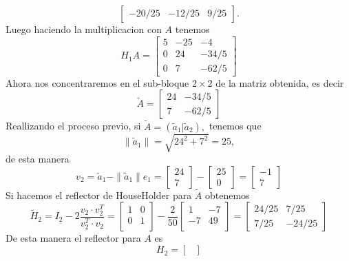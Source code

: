 \begin{enumerate}
\begin{solution}
$$\begin{bmatrix}
                -20/25&-12/25&9/25
            \end{bmatrix}.$$
            Luego haciendo la multiplicacion con $A$ tenemos
            $$H_1A=\begin{bmatrix}
                5&-25&-4\\
                0&24&-34/5\\
                0&7&-62/5
            \end{bmatrix}$$
            Ahora nos concentraremos en el sub-bloque $2\times 2$ de la matriz obtenida, es decir
            $$\tilde{A}=\begin{bmatrix}
                24&-34/5\\
                7&-62/5
            \end{bmatrix}$$
            Reallizando el proceso previo, si $\tilde{A}=(\tilde{a}_1|\tilde{a}_2),$ tenemos que
            $$\|\tilde{a}_1\|=\sqrt{24^2+7^2}=25,$$
            de esta manera
            $$v_2=\tilde{a}_1-\|\tilde{a}_1\|e_1=\begin{bmatrix}
                24\\
                7
            \end{bmatrix}-\begin{bmatrix}
                25\\
                0
            \end{bmatrix}=\begin{bmatrix}
                -1\\
                7
            \end{bmatrix}$$
            Si hacemos el reflector de HouseHolder para $\tilde{A}$ obtenemos
            $$\tilde{H}_2=I_2-2\frac{v_2\cdot v_2^T}{v_2^T\cdot v_2}=\begin{bmatrix}
                1&0\\
                0&1\\
            \end{bmatrix}-\frac{2}{50}\begin{bmatrix}
                1 & -7\\
                -7 & 49\\
            \end{bmatrix}=\begin{bmatrix}
                24/25&7/25\\
                7/25&-24/25
            \end{bmatrix}$$
            De esta manera el reflector para $A$ es
            $$H_2=\begin{bmatrix}

\end{bmatrix}$$
\end{solution}
\end{enumerate}
